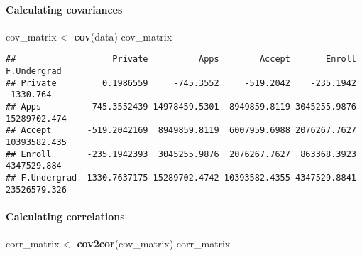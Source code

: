 \documentclass[]{article}
\newenvironment{Shaded}{\begin{snugshade}}{\end{snugshade}}
\newcommand{\KeywordTok}[1]{\textcolor[rgb]{0.13,0.29,0.53}{\textbf{#1}}}
\newcommand{\NormalTok}[1]{#1}
\newcommand{\OperatorTok}[1]{\textcolor[rgb]{0.81,0.36,0.00}{\textbf{#1}}}
\newcommand{\StringTok}[1]{\textcolor[rgb]{0.31,0.60,0.02}{#1}}
\let\oldparagraph\paragraph
\renewcommand{\paragraph}[1]{\oldparagraph{#1}\mbox{}}
\begin{document}
\begin{Shaded}
\end{Shaded}

\hypertarget{calculating-covariances}{%
\paragraph{Calculating covariances}\label{calculating-covariances}}

\begin{Shaded}
\begin{Highlighting}[]
\NormalTok{cov_matrix <-}\StringTok{ }\KeywordTok{cov}\NormalTok{(data)}
\NormalTok{cov_matrix}
\end{Highlighting}
\end{Shaded}

\begin{verbatim}
##                   Private          Apps        Accept       Enroll  F.Undergrad
## Private         0.1986559     -745.3552     -519.2042    -235.1942    -1330.764
## Apps         -745.3552439 14978459.5301  8949859.8119 3045255.9876 15289702.474
## Accept       -519.2042169  8949859.8119  6007959.6988 2076267.7627 10393582.435
## Enroll       -235.1942393  3045255.9876  2076267.7627  863368.3923  4347529.884
## F.Undergrad -1330.7637175 15289702.4742 10393582.4355 4347529.8841 23526579.326
\end{verbatim}

\newpage

\hypertarget{calculating-correlations}{%
\paragraph{Calculating correlations}\label{calculating-correlations}}

\begin{Shaded}
\begin{Highlighting}[]
\NormalTok{corr_matrix <-}\StringTok{ }\KeywordTok{cov2cor}\NormalTok{(cov_matrix)}
\NormalTok{corr_matrix}
\end{Highlighting}
\end{Shaded}
\end{document}

